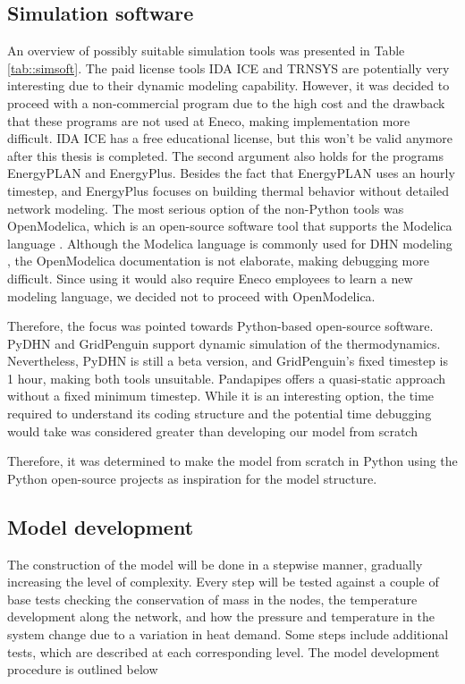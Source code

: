 \subsection{Simulation software}\label{sec::SimulationModel}
An overview of possibly suitable simulation tools was presented in Table \ref{tab::simsoft}. The paid license tools IDA ICE and TRNSYS are potentially very interesting due to their dynamic modeling capability. However, it was decided to proceed with a non-commercial program due to the high cost and the drawback that these programs are not used at Eneco, making implementation more difficult. IDA ICE has a free educational license, but this won't be valid anymore after this thesis is completed. The second argument also holds for the programs EnergyPLAN and EnergyPlus. Besides the fact that EnergyPLAN uses an hourly timestep, and EnergyPlus focuses on building thermal behavior without detailed network modeling. The most serious option of the non-Python tools was OpenModelica, which is an open-source software tool that supports the Modelica language \cite{Modelica}. Although the Modelica language is commonly used for DHN modeling \cite{KUNTUAROVA}, the OpenModelica documentation is not elaborate, making debugging more difficult. Since using it would also require Eneco employees to learn a new modeling language, we decided not to proceed with OpenModelica.

Therefore, the focus was pointed towards Python-based open-source software. PyDHN and GridPenguin support dynamic simulation of the thermodynamics. Nevertheless, PyDHN is still a beta version, and GridPenguin's fixed timestep is 1 hour, making both tools unsuitable. Pandapipes offers a quasi-static approach without a fixed minimum timestep. While it is an interesting option, the time required to understand its coding structure and the potential time debugging would take was considered greater than developing our model from scratch

Therefore, it was determined to make the model from scratch in Python using the Python open-source projects as inspiration for the model structure.

\subsection{Model development}
The construction of the model will be done in a stepwise manner, gradually increasing the level of complexity. Every step will be tested against a couple of base tests checking the conservation of mass in the nodes, the temperature development along the network, and how the pressure and temperature in the system change due to a variation in heat demand. Some steps include additional tests, which are described at each corresponding level. The model development procedure is outlined below

